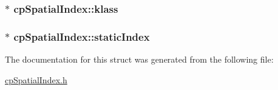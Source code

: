 \subsubsection[{klass}]{$\ast$ cp\+Spatial\+Index\+::klass}\label{structcp_spatial_index_a50ab17be758c40f3418556c34a0d874b}
\hypertarget{structcp_spatial_index_a5f335a8f9cb241596a08c6ea16ae726b}{}
\subsubsection[{static\+Index}]{$\ast$ cp\+Spatial\+Index\+::static\+Index}\label{structcp_spatial_index_a5f335a8f9cb241596a08c6ea16ae726b}


The documentation for this struct was generated from the following file\+:\begin{DoxyCompactItemize}
\item 
\hyperlink{cp_spatial_index_8h}{cp\+Spatial\+Index.\+h}\end{DoxyCompactItemize}

